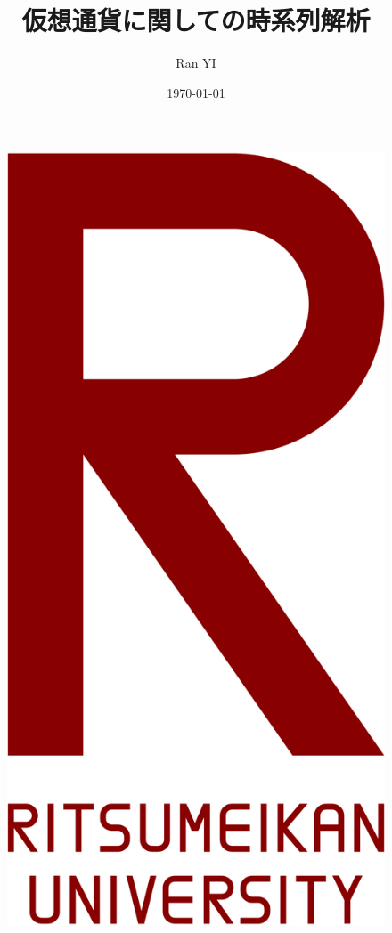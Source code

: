 \documentclass{beamer}  %
\author{Ran YI}
\title{仮想通貨に関しての時系列解析}
\subtitle{}
\institute{
    Department of Mathematical Sciences \\
    Ritsumeikan University
}
\date{\today}
\begin{document}
\begin{frame}
    \titlepage
    \begin{figure}[ht]
        \begin{center}
            \includegraphics[keepaspectratio, scale=0.017]{pic/Ritsumeikan_University_Logo.png}
        \end{center}
    \end{figure}
\end{frame}
\end{document}
